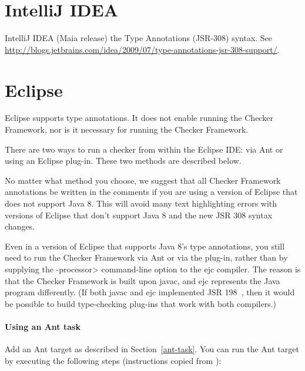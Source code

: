

\section{IntelliJ IDEA\label{intellij}}

IntelliJ IDEA (Maia release)
the Type Annotations (JSR-308) syntax.
See \url{http://blogs.jetbrains.com/idea/2009/07/type-annotations-jsr-308-support/}.

\section{Eclipse\label{eclipse}}

Eclipse supports type
annotations.  It
does not enable running the Checker Framework, nor is it necessary for
running the Checker Framework.

There are two ways to run a checker from within the Eclipse IDE:  via Ant
or using an Eclipse plug-in.  These two methods are described below.

No matter what method you choose, we suggest that
all Checker Framework annotations be written in the comments
if you are using a version of Eclipse that
does not support Java 8.  This will avoid many
text highlighting errors with versions of Eclipse that don't support Java 8 and the
new JSR 308 syntax changes.

Even in a version of Eclipse that supports Java 8's type annotations, you
still need to run the Checker Framework via Ant or via the plug-in, rather
than by supplying the \<-processor> command-line option to the ejc
compiler.  The reason is that the Checker Framework is built upon javac,
and ejc represents the Java program differently.  (If both javac and ejc
implemented JSR 198~\cite{JSR198}, then it would be possible to build
type-checking plug-ins that work with both compilers.)


\paragraph{Using an Ant task}

Add an Ant target as described in Section~\ref{ant-task}.  You can
run the Ant target by executing the following steps
(instructions copied from
):

